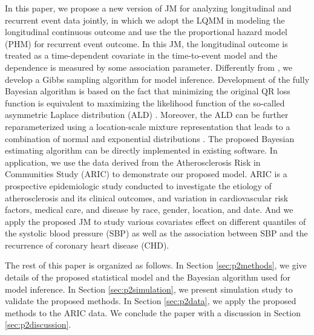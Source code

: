 In this paper, we propose a new version of JM for analyzing longitudinal and recurrent event data jointly, in which we adopt the LQMM in modeling the longitudinal continuous outcome and use the the proportional hazard model (PHM) for recurrent event outcome. In this JM, the longitudinal outcome is treated as a time-dependent covariate in the time-to-event model and the dependence is measured by some association parameter. Differently from \cite{farcomeni2015longitudinal}, we develop a Gibbs sampling algorithm for model inference. Development of the fully Bayesian algorithm is based on the fact that minimizing the original QR loss function is equivalent to maximizing the likelihood function of the so-called asymmetric Laplace distribution (ALD) \citep{yu2001bayesian}. Moreover, the ALD can be further reparameterized using a location-scale mixture representation that leads to a combination of normal and exponential distributions \citep{kotz2001laplace, kozumi2011gibbs}. The proposed Bayesian estimating algorithm can be directly implemented in existing software. In application, we use the data derived from the Atherosclerosis Risk in Communities Study (ARIC) to demonstrate our proposed model. ARIC is a prospective epidemiologic study conducted to investigate the etiology of atherosclerosis and its clinical outcomes, and variation in cardiovascular risk factors, medical care, and disease by race, gender, location, and date. And we apply the proposed JM to study various covariates effect on different quantiles of the systolic blood pressure (SBP) as well as the association between SBP and the recurrence of coronary heart disease (CHD).

The rest of this paper is organized as follows. In Section \ref{sec:p2methods}, we give details of the proposed statistical model and the Bayesian algorithm used for model inference. In Section \ref{sec:p2simulation}, we present simulation study to validate the proposed methods. In Section \ref{sec:p2data}, we apply the proposed methods to the ARIC data. We conclude the paper with a discussion in Section \ref{sec:p2discussion}.
% 
% 

